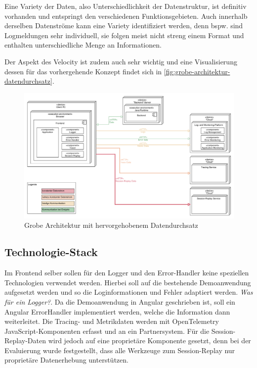 Eine Variety der Daten, also Unterschiedlichkeit der Datenstruktur, ist definitiv vorhanden und entspringt den verschiedenen Funktionsgebieten. Auch innerhalb derselben Datenströme kann eine Variety identifiziert werden, denn bspw. sind Logmeldungen sehr individuell, sie folgen meist nicht streng einem Format und enthalten unterschiedliche Menge an Informationen.

Der Aspekt des Velocity ist zudem auch sehr wichtig und eine Visualisierung dessen für das vorhergehende Konzept findet sich in \autoref{fig:grobe-architektur-datendurchsatz}.
	
\begin{figure}[H]
	\centering
	\includegraphics[width=0.75\linewidth]{img/04_erstellung-poc/konzept-datendurchsatz.png}
	\caption{Grobe Architektur mit hervorgehobenem Datendurchsatz}
	\label{fig:grobe-architektur-datendurchsatz}
\end{figure}

\pagebreak

	\subsection{Technologie-Stack}
	\label{sec:technologie-stack}

	Im Frontend selber sollen für den Logger und den Error-Handler keine speziellen Technologien verwendet werden. Hierbei soll auf die bestehende Demoanwendung aufgesetzt werden und so die Loginformationen und Fehler adaptiert werden. \textit{\color{red}Was für ein Logger?}. Da die Demoanwendung in Angular geschrieben ist, soll ein Angular ErrorHandler implementiert werden, welche die Information dann weiterleitet. Die Tracing- und Metrikdaten werden mit OpenTelemetry JavaScript-Komponenten erfasst und an ein Partnersystem. Für die Session-Replay-Daten wird jedoch auf eine proprietäre Komponente gesetzt, denn bei der Evaluierung wurde festgestellt, dass alle Werkzeuge zum Session-Replay nur proprietäre Datenerhebung unterstützen.
	
